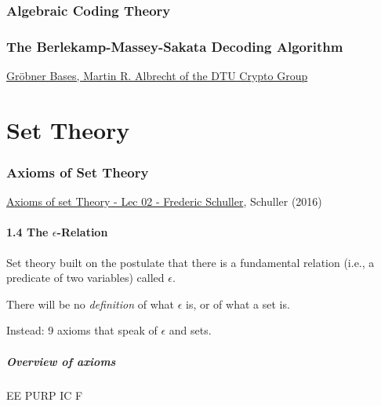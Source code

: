 \documentclass[10pt]{amsart}
\begin{document}
\begin{multicols*}{2}
\section{Algebraic Coding Theory}


\section{The Berlekamp-Massey-Sakata Decoding Algorithm}





\href{https://martinralbrecht.files.wordpress.com/2010/07/20131022_buchberger_dtu.pdf}{Gr\"{o}bner Bases, Martin R. Albrecht of the DTU Crypto Group}

\part{Set Theory}

\section{Axioms of Set Theory}

\href{https://youtu.be/AAJB9l-HAZs?si=_yI6uRj7Vg1t0BbP}{ Axioms of set Theory - Lec 02 - Frederic Schuller}, Schuller (2016) \cite{Schu2016}

\subsection{1.4 The $\epsilon$-Relation}

Set theory built on the postulate that there is a fundamental relation (i.e., a predicate of two variables) called $\epsilon$.

There will be no \emph{definition} of what $\epsilon$ is, or of what a set is.

Instead: 9 axioms that speak of $\epsilon$ and sets.

\subsubsection*{Overview of axioms}

EE PURP IC F


\end{multicols*}
\end{document}
